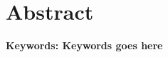 \setlength{\parindent}{2em} 
\section*{Abstract}\lipsum[2-4]


\noindent \textbf{Keywords: Keywords goes here}